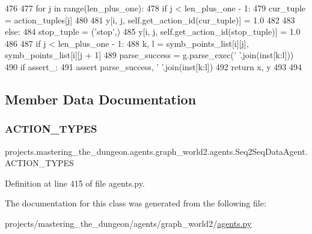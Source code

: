 \begin{DoxyCode}
476 
477             \textcolor{keywordflow}{for} j \textcolor{keywordflow}{in} range(len\_plus\_one):
478                 \textcolor{keywordflow}{if} j < len\_plus\_one - 1:
479                     cur\_tuple = action\_tuples[j]
480 
481                     y[i, j, self.get\_action\_id(cur\_tuple)] = 1.0
482 
483                 \textcolor{keywordflow}{else}:
484                     stop\_tuple = (\textcolor{stringliteral}{'stop'},)
485                     y[i, j, self.get\_action\_id(stop\_tuple)] = 1.0
486 
487                 \textcolor{keywordflow}{if} j < len\_plus\_one - 1:
488                     k, l = symb\_points\_list[i][j], symb\_points\_list[i][j + 1]
489                     parse\_success = g.parse\_exec(\textcolor{stringliteral}{' '}.join(inst[k:l]))
490                     \textcolor{keywordflow}{if} assert\_:
491                         \textcolor{keyword}{assert} parse\_success, \textcolor{stringliteral}{' '}.join(inst[k:l])
492         \textcolor{keywordflow}{return} x, y
493 
494 
\end{DoxyCode}


\subsection{Member Data Documentation}
\mbox{\label{classprojects_1_1mastering__the__dungeon_1_1agents_1_1graph__world2_1_1agents_1_1Seq2SeqDataAgent_a698d961e03b940ec4ff537c209a9da02}} 
\subsubsection{\texorpdfstring{A\+C\+T\+I\+O\+N\+\_\+\+T\+Y\+P\+ES}{ACTION\_TYPES}}
{\footnotesize\ttfamily projects.\+mastering\+\_\+the\+\_\+dungeon.\+agents.\+graph\+\_\+world2.\+agents.\+Seq2\+Seq\+Data\+Agent.\+A\+C\+T\+I\+O\+N\+\_\+\+T\+Y\+P\+ES}



Definition at line 415 of file agents.\+py.



The documentation for this class was generated from the following file\+:\begin{DoxyCompactItemize}
\item 
projects/mastering\+\_\+the\+\_\+dungeon/agents/graph\+\_\+world2/\hyperlink{projects_2mastering__the__dungeon_2agents_2graph__world2_2agents_8py}{agents.\+py}\end{DoxyCompactItemize}
